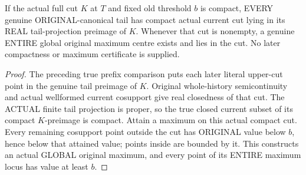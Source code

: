 \begin{lemma}
\label{hir:original-current-compact-cut-tail-compact-and-global-max}
\leanok
If the actual full cut $K$ at $T$ and fixed old threshold $b$ is compact,
EVERY genuine ORIGINAL-canonical tail has compact actual current cut lying
in its REAL tail-projection preimage of $K$. Whenever that cut is nonempty,
a genuine ENTIRE global original maximum centre exists and lies in the cut.
No later compactness or maximum certificate is supplied.
\end{lemma}
\begin{proof}
The preceding true prefix comparison puts each later literal upper-cut point
in the genuine tail preimage of $K$. Original whole-history semicontinuity
and actual wellformed current cosupport give real closedness of that cut.
The ACTUAL finite tail projection is proper, so the true closed current
subset of its compact $K$-preimage is compact. Attain a maximum on this
actual compact cut. Every remaining cosupport point outside the cut has
ORIGINAL value below $b$, hence below that attained value; points inside
are bounded by it. This constructs an actual GLOBAL original maximum,
and every point of its ENTIRE maximum locus has value at least $b$.
\end{proof}


